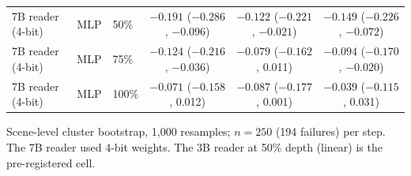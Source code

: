 \begin{table}[htbp]
\begin{tabular}{@{}lllccc@{}}
7B reader (4-bit) & MLP & 50\% & $-0.191$ ($-0.286$, $-0.096$) & $-0.122$ ($-0.221$, $-0.021$) & $-0.149$ ($-0.226$, $-0.072$) \\
7B reader (4-bit) & MLP & 75\% & $-0.124$ ($-0.216$, $-0.036$) & $-0.079$ ($-0.162$, 0.011) & $-0.094$ ($-0.170$, $-0.020$) \\
7B reader (4-bit) & MLP & 100\% & $-0.071$ ($-0.158$, 0.012) & $-0.087$ ($-0.177$, 0.001) & $-0.039$ ($-0.115$, 0.031) \\
\bottomrule
\end{tabular}
\par\smallskip\raggedright\footnotesize
Scene-level cluster bootstrap, 1,000 resamples; $n = 250$ (194 failures) per step. The 7B reader used 4-bit weights. The 3B reader at 50\% depth (linear) is the pre-registered cell.
\end{table}
